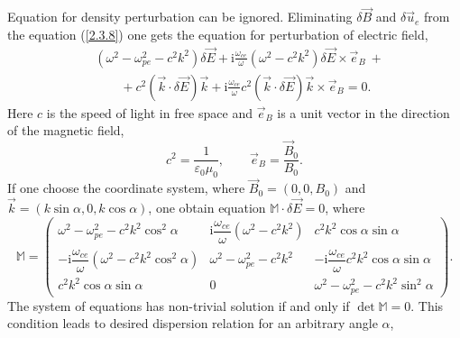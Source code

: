 Equation for density perturbation can be ignored. Eliminating $ \delta \vec{B} $ and $ \delta \vec{u}_{e} $ from the equation (\ref{2.3.8}) one gets the equation for perturbation of electric field,
\begin{equation}
\begin{split}
\label{2.3.9}
& \left( \omega^{2} - \omega_{pe}^{2} - c^{2} k^{2} \right) \delta \vec{E} + \mathrm{i} \frac{\omega_{ce}}{\omega} \left( \omega^{2} - c^{2} k^{2} \right) \delta \vec{E} \times \vec{e}_{B} \: + \\[5pt]
& \qquad + c^{2} \left( \vec{k} \cdot \delta \vec{E} \right) \vec{k} + \mathrm{i} \frac{\omega_{ce}}{\omega} c^{2} \left( \vec{k} \cdot \delta \vec{E} \right) \vec{k} \times \vec{e}_{B} = 0.
\end{split}
\end{equation}
Here $ c $ is the speed of light in free space and $ \vec{e}_{B} $ is a unit vector in the direction of the magnetic field,
\begin{equation}
\label{2.3.10}
c^{2} = \frac{1}{\varepsilon_{0} \mu_{0}}, \qquad \vec{e}_{B} = \frac{\vec{B}_{0}}{B_{0}}.
\end{equation}
If one choose the coordinate system, where $ \vec{B}_{0} = (0, 0, B_{0}) $ and $ \vec{k} = (k \sin \alpha, 0, k \cos \alpha) $, one obtain equation $ \mathbb{M} \cdot \delta \vec{E} = 0 $, where
\begingroup
\renewcommand*{\arraystretch}{1.8}
\begin{equation}
\label{2.3.11}
\mathbb{M} =  \begin{pmatrix}
 \omega^{2} - \omega_{pe}^{2} - c^{2} k^{2} \cos^{2} \alpha & \mathrm{i} \dfrac{\omega_{ce}}{\omega} \left( \omega^{2} - c^{2} k^{2} \right)  & c^{2} k^{2} \cos \alpha \sin \alpha \\
 - \mathrm{i} \dfrac{\omega_{ce}}{\omega} \left( \omega^{2} - c^{2} k^{2} \cos^{2} \alpha \right) & \omega^{2} - \omega_{pe}^{2} - c^{2} k^{2} & - \mathrm{i} \dfrac{\omega_{ce}}{\omega} c^{2} k^{2} \cos \alpha \sin \alpha \\
 c^{2} k^{2} \cos \alpha \sin \alpha & 0 & \omega^{2} - \omega_{pe}^{2} - c^{2} k^{2} \sin^{2} \alpha
 \end{pmatrix}.
\end{equation} 
\endgroup
The system of equations has non-trivial solution if and only if $ \det \mathbb{M} = 0 $. This condition leads to desired dispersion relation for an arbitrary angle $ \alpha $,

